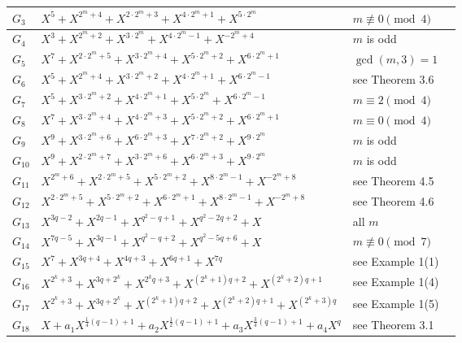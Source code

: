 \documentclass[12pt]{amsart}
\numberwithin{equation}{section}
\theoremstyle{definition}
\begin{document}
\begin{longtable}{|m{2em}|m{21em}|m{9em}|m{2em}|}
$G_{3}$& $X^5 + X^{2^m+4} + X^{2 \cdot 2^m+3} + X^{4 \cdot 2^m +1} + X^{5 \cdot 2^m}$ & $m \not \equiv 0 \pmod 4$ & \cite{Xu_penta_18}\\
\hline
$G_{4}$& $X^3 + X^{2^m+2} + X^{3 \cdot 2^m} + X^{4 \cdot 2^m -1} + X^{-2^m+4}$ & $m$ is odd &\cite{Xu_penta_18} \\
\hline
$G_{5}$& $X^7 + X^{2 \cdot 2^m+5} + X^{3 \cdot 2^m+4} + X^{5 \cdot 2^m +2} + X^{6 \cdot 2^m+1}$ & $\gcd(m,3)=1$ & \cite{Xu_penta_18}\\
\hline
$G_{6}$& $X^5 + X^{2^m+4} + X^{3 \cdot 2^m+2} + X^{4 \cdot 2^m +1} + X^{6 \cdot 2^m-1}$ & see Theorem 3.6 & \cite{Xu_penta_18}\\
\hline
$G_{7}$& $X^5 + X^{3 \cdot 2^m+2} + X^{4 \cdot 2^m+1} + X^{5 \cdot 2^m} + X^{6 \cdot 2^m-1}$ & $m \equiv 2 \pmod 4$ & \cite{Xu_penta_18}\\
\hline
$G_{8}$& $X^7 + X^{3 \cdot 2^m+4} + X^{4 \cdot 2^m+3} + X^{5 \cdot 2^m+2} + X^{6 \cdot 2^m+1}$ & $m \equiv 0 \pmod 4$ & \cite{Xu_penta_18}\\
\hline
$G_{9}$& $X^9 + X^{3 \cdot 2^m+6} + X^{6 \cdot 2^m+3} + X^{7 \cdot 2^m+2} + X^{9 \cdot 2^m}$ & $m$ is odd & \cite{Xu_penta_18}\\
\hline
$G_{10}$ & $X^9 + X^{2 \cdot 2^m+7} + X^{3 \cdot 2^m+6} + X^{6 \cdot 2^m+3} + X^{9 \cdot 2^m}$ & $m$ is odd & \cite{Xu_penta_18}\\
\hline
$G_{11}$& $X^{2^m+6} + X^{2 \cdot 2^m+5} + X^{5 \cdot 2^m+2} + X^{8 \cdot 2^m-1} + X^{- 2^m+8}$ & see Theorem 4.5 & \cite{Xu_penta_18}\\
\hline
$G_{12}$& $X^{2 \cdot 2^m+5} + X^{5 \cdot 2^m+2} + X^{6 \cdot 2^m+1} + X^{8 \cdot 2^m-1} + X^{- 2^m+8}$ & see Theorem 4.6 &\cite{Xu_penta_18} \\
\hline
$G_{13}$& $X^{3q-2} + X^{2q-1} + X^{q^2-q+1} + X^{q^2-2q+2} + X$ & all $m$  & \cite{LQW}\\
\hline
$G_{14}$& $X^{7q-5} + X^{3q-1} + X^{q^2-q+2} + X^{q^2-5q+6} + X$ & $m \not \equiv 0 \pmod 7$  & \cite{LQW}\\
\hline
$G_{15}$& $X^{7} + X^{3q+4} + X^{4q+3} + X^{6q+1} + X^{7q}$ & see Example 1(1)  & \cite{Deng}\\
\hline
$G_{16}$& $X^{2^k+3} + X^{3q+2^k} + X^{2^kq+3} + X^{(2^k+1)q+2} + X^{(2^k+2)q+1}$ & see Example 1(4) & \cite{Deng}\\
\hline
$G_{17}$& $X^{2^k+3} + X^{3q+2^k} + X^{(2^k+1)q+2} + X^{(2^k+2)q+1} + X^{(2^k+3)q}$ & see Example 1(5) & \cite{Deng}\\
\hline
$G_{18}$& $X+a_1 X^{\frac{1}{4}(q-1)+1}+a_2 X^{\frac{1}{2}(q-1)+1}+a_3 X^{\frac{3}{4}(q-1)+1}+a_4 X^{q}$ & see Theorem 3.1 & \cite{Zhang_penta_23}\\

\end{longtable}
\end{document}
